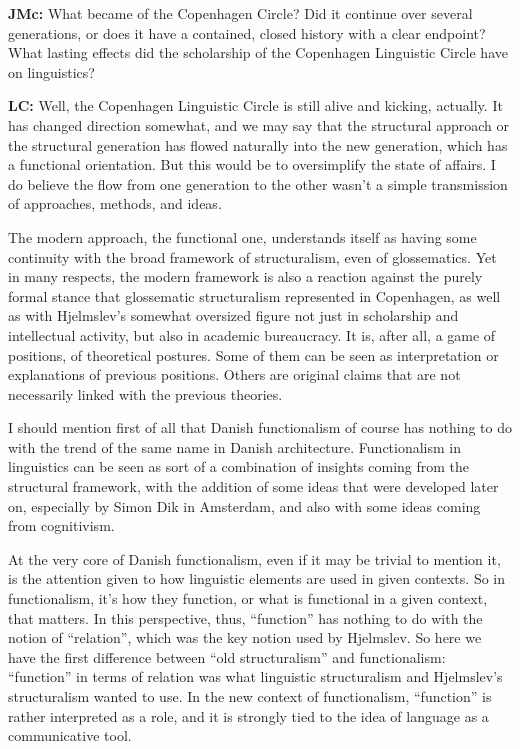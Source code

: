 \begin{styleStandard}
\textbf{JMc:} What became of the Copenhagen Circle? Did it continue over several generations, or does it have a contained, closed history with a clear endpoint? What lasting effects did the scholarship of the Copenhagen Linguistic Circle have on linguistics?
\end{styleStandard}

\begin{styleStandard}
\textbf{LC:} Well, the Copenhagen Linguistic Circle is still alive and kicking, actually. It has changed direction somewhat, and we may say that the structural approach or the structural generation has flowed naturally into the new generation, which has a functional orientation. But this would be to oversimplify the state of affairs. I do believe the flow from one generation to the other wasn’t a simple transmission of approaches, methods, and ideas. 
\end{styleStandard}

\begin{styleStandard}
The modern approach, the functional one, understands itself as having some continuity with the broad framework of structuralism, even of glossematics. Yet in many respects, the modern framework is also a reaction against the purely formal stance that glossematic structuralism represented in Copenhagen, as well as with Hjelmslev’s somewhat oversized figure not just in scholarship and intellectual activity, but also in academic bureaucracy. It is, after all, a game of positions, of theoretical postures. Some of them can be seen as interpretation or explanations of previous positions. Others are original claims that are not necessarily linked with the previous theories. 
\end{styleStandard}

\begin{styleStandard}
I should mention first of all that Danish functionalism of course has nothing to do with the trend of the same name in Danish architecture. Functionalism in linguistics can be seen as sort of a combination of insights coming from the structural framework, with the addition of some ideas that were developed later on, especially by Simon Dik in Amsterdam, and also with some ideas coming from cognitivism. 
\end{styleStandard}

\begin{styleStandard}
At the very core of Danish functionalism, even if it may be trivial to mention it, is the attention given to how linguistic elements are used in given contexts. So in functionalism, it’s how they function, or what is functional in a given context, that matters. In this perspective, thus, “function” has nothing to do with the notion of “relation”, which was the key notion used by Hjelmslev. So here we have the first difference between “old structuralism” and functionalism: “function” in terms of relation was what linguistic structuralism and Hjelmslev’s structuralism wanted to use. In the new context of functionalism, “function” is rather interpreted as a role, and it is strongly tied to the idea of language as a communicative tool. 
\end{styleStandard}

